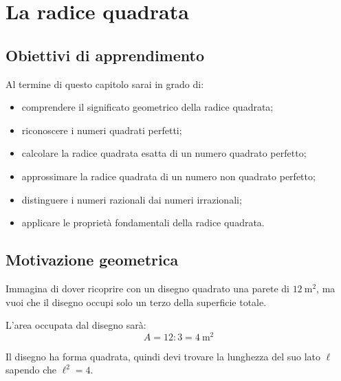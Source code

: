 
\chapter{La radice quadrata}

\section*{Obiettivi di apprendimento}

Al termine di questo capitolo sarai in grado di:

\begin{itemize}
    \item comprendere il significato geometrico della radice quadrata;
    \item riconoscere i numeri quadrati perfetti;
    \item calcolare la radice quadrata esatta di un numero quadrato perfetto;
    \item approssimare la radice quadrata di un numero non quadrato perfetto;
    \item distinguere i numeri razionali dai numeri irrazionali;
    \item applicare le proprietà fondamentali della radice quadrata.
\end{itemize}

\section{Motivazione geometrica}

Immagina di dover ricoprire con un disegno quadrato una parete di \(12\ \text{m}^2\),
ma vuoi che il disegno occupi solo un terzo della superficie totale.

L'area occupata dal disegno sarà:
\[
    A = 12 : 3 = 4\ \text{m}^2
\]

Il disegno ha forma quadrata, quindi devi trovare la lunghezza del suo lato \(\ell\)
sapendo che \(\ell^2 = 4\).

